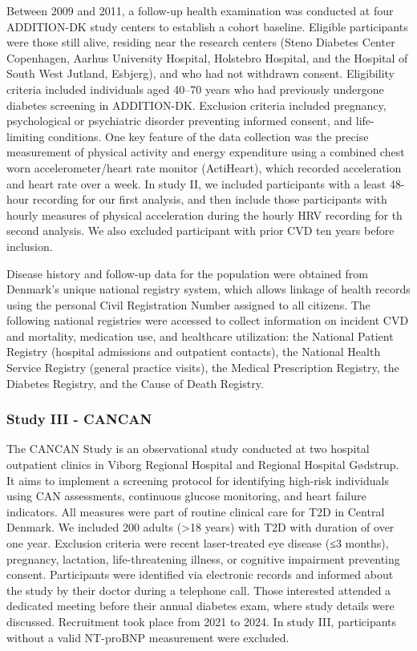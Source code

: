 \documentclass[
  a4paper,
  headsepline=true,
  open=any]{scrbook}
\begin{document}
Between 2009 and 2011, a follow-up health examination was conducted at
four ADDITION-DK study centers to establish a cohort baseline. Eligible
participants were those still alive, residing near the research centers
(Steno Diabetes Center Copenhagen, Aarhus University Hospital, Holstebro
Hospital, and the Hospital of South West Jutland, Esbjerg), and who had
not withdrawn consent. Eligibility criteria included individuals aged
40--70 years who had previously undergone diabetes screening in
ADDITION-DK. Exclusion criteria included pregnancy, psychological or
psychiatric disorder preventing informed consent, and life-limiting
conditions. One key feature of the data collection was the precise
measurement of physical activity and energy expenditure using a combined
chest worn accelerometer/heart rate monitor (ActiHeart), which recorded
acceleration and heart rate over a week. In study II, we included
participants with a least 48-hour recording for our first analysis, and
then include those participants with hourly measures of physical
acceleration during the hourly HRV recording for th second analysis. We
also excluded participant with prior CVD ten years before inclusion.

Disease history and follow-up data for the population were obtained from
Denmark's unique national registry system, which allows linkage of
health records using the personal Civil Registration Number assigned to
all citizens. The following national registries were accessed to collect
information on incident CVD and mortality, medication use, and
healthcare utilization: the National Patient Registry (hospital
admissions and outpatient contacts), the National Health Service
Registry (general practice visits), the Medical Prescription Registry,
the Diabetes Registry, and the Cause of Death Registry.

\hypertarget{study-iii---cancan}{%
\subsubsection{Study III - CANCAN}\label{study-iii---cancan}}

The CANCAN Study is an observational study conducted at two hospital
outpatient clinics in Viborg Regional Hospital and Regional Hospital
Gødstrup. It aims to implement a screening protocol for identifying
high-risk individuals using CAN assessments, continuous glucose
monitoring, and heart failure indicators. All measures were part of
routine clinical care for T2D in Central Denmark. We included 200 adults
(\textgreater18 years) with T2D with duration of over one year.
Exclusion criteria were recent laser-treated eye disease (≤3 months),
pregnancy, lactation, life-threatening illness, or cognitive impairment
preventing consent. Participants were identified via electronic records
and informed about the study by their doctor during a telephone call.
Those interested attended a dedicated meeting before their annual
diabetes exam, where study details were discussed. Recruitment took
place from 2021 to 2024. In study III, participants without a valid
NT-proBNP measurement were excluded.
\end{document}
